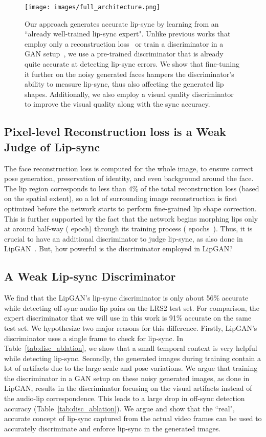 \documentclass[sigconf]{acmart}
\begin{document}
\begin{figure*}
 \texttt{[image: images/full\_architecture.png]}
 
 \caption{Our approach generates accurate lip-sync by learning from an ``already well-trained lip-sync expert". Unlike previous works that employ only a reconstruction loss~\cite{jamaludin2019you} or train a discriminator in a GAN setup~\cite{kr2019towards}, we use a pre-trained discriminator that is already quite accurate at detecting lip-sync errors. We show that fine-tuning it further on the noisy generated faces hampers the discriminator's ability to measure lip-sync, thus also affecting the generated lip shapes. Additionally, we also employ a visual quality discriminator to improve the visual quality along with the sync accuracy.}
 \label{fig:full_arch}
\end{figure*}
\subsection{Pixel-level Reconstruction loss is a Weak Judge of Lip-sync}
The face reconstruction loss is computed for the whole image, to ensure correct pose generation, preservation of identity, and even background around the face. The lip region corresponds to less than 4\% of the total reconstruction loss (based on the spatial extent), so a lot of surrounding image reconstruction is first optimized before the network starts to perform fine-grained lip shape correction. This is further supported by the fact that the network begins morphing lips only at around half-way ( epoch) through its training process ( epochs~\cite{kr2019towards}). Thus, it is crucial to have an additional discriminator to judge lip-sync, as also done in LipGAN~\cite{kr2019towards}. But, how powerful is the discriminator employed in LipGAN?

\subsection{A Weak Lip-sync Discriminator}
\label{section:nodisc}
We find that the LipGAN's lip-sync discriminator is only about 56\% accurate while detecting off-sync audio-lip pairs on the LRS2 test set. For comparison, the expert discriminator that we will use in this work is 91\% accurate on the same test set. We hypothesize two major reasons for this difference. Firstly, LipGAN's discriminator uses a single frame to check for lip-sync. In Table~\ref{tab:disc_ablation}, we show that a small temporal context is very helpful while detecting lip-sync. Secondly, the generated images during training contain a lot of artifacts due to the large scale and pose variations. We argue that training the discriminator in a GAN setup on these noisy generated images, as done in LipGAN, results in the discriminator focusing on the visual artifacts instead of the audio-lip correspondence. This leads to a large drop in off-sync detection accuracy (Table~\ref{tab:disc_ablation}). We argue and show that the ``real", accurate concept of lip-sync captured from the actual video frames can be used to accurately discriminate and enforce lip-sync in the generated images.
\end{document}
